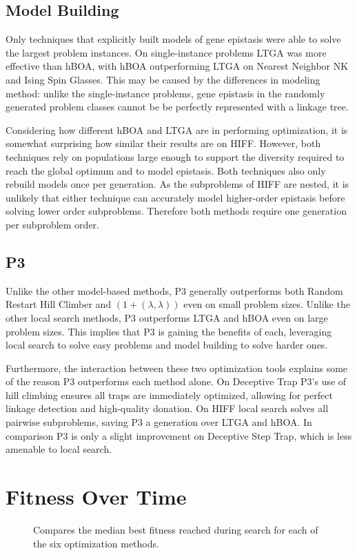 \subsection{Model Building}
Only techniques that explicitly built models of gene epistasis were able to solve the largest problem
instances. On single-instance problems LTGA was more effective than hBOA, with hBOA outperforming
LTGA on Nearest Neighbor NK and Ising Spin Glasses. This may be caused by the differences in modeling method:
unlike the single-instance problems, gene epistasis in the randomly generated
problem classes cannot be be perfectly represented with a linkage tree.

Considering how different hBOA and LTGA are in performing optimization, it is somewhat surprising how similar
their results are on HIFF.
However, both techniques rely on populations large enough to support the diversity required to reach the global optimum
and to model epistasis. Both techniques also only rebuild models once per generation. As the subproblems of HIFF
are nested, it is unlikely that either technique can accurately model higher-order epistasis before solving
lower order subproblems. Therefore both methods require one generation per subproblem order.

\subsection{P3}
Unlike the other model-based methods, P3 generally outperforms
both Random Restart Hill Climber and $(1+(\lambda, \lambda))$ even on small problem sizes.
Unlike the other local search methods, P3 outperforms LTGA and hBOA even on large problem sizes.
This implies that P3 is gaining the benefits of each, leveraging local search to solve easy
problems and model building to solve harder ones.

Furthermore, the interaction between these two optimization tools explains some of the reason P3
outperforms each method alone.
On Deceptive Trap P3's use of hill climbing ensures all traps are immediately optimized, allowing for perfect
linkage detection and high-quality donation.
On HIFF local search solves all pairwise subproblems, saving P3 a generation over LTGA and hBOA.
In comparison P3 is only a slight improvement on Deceptive Step Trap, which is less amenable to local search.

\section{Fitness Over Time}
\label{sec-overtime}
\begin{figure}
  \begin{center}
  \end{center}
  \caption{Compares the median best fitness reached during search for each of the six optimization methods.}
  \label{fig-fitness-over-time}
\end{figure}

